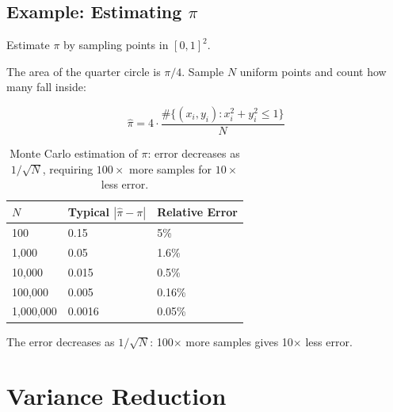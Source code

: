 \subsection{Example: Estimating $\pi$}

 Estimate $\pi$ by sampling points in $[0,1]^2$.

The area of the quarter circle is $\pi/4$. Sample $N$ uniform points and count how many fall inside:

\begin{equation}
    \hat{\pi} = 4 \cdot \frac{\#\{(x_i, y_i) : x_i^2 + y_i^2 \leq 1\}}{N}
\end{equation}


\begin{table}[ht]
\centering
\begin{tabular}{p{}p{}p{}}
\toprule
$N$ & Typical $|\hat{\pi} - \pi|$ & Relative Error \\
\midrule
100 & 0.15 & 5\% \\
1,000 & 0.05 & 1.6\% \\
10,000 & 0.015 & 0.5\% \\
100,000 & 0.005 & 0.16\% \\
1,000,000 & 0.0016 & 0.05\% \\
\bottomrule
\end{tabular}
\vspace{2em}
\caption{Monte Carlo estimation of $\pi$: error decreases as $1/\sqrt{N}$, requiring $100\times$ more samples for $10\times$ less error.}
\label{tab:mc_pi}
\end{table}

The error decreases as $1/\sqrt{N}$: 100$\times$ more samples gives 10$\times$ less error.




\newpage
\section{Variance Reduction}

